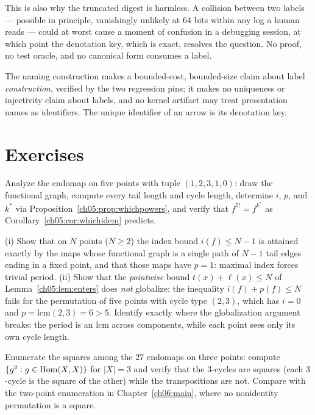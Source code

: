 This is also why the truncated digest is harmless. A collision between two
labels --- possible in principle, vanishingly unlikely at 64 bits within
any log a human reads --- could at worst cause a moment of confusion in a
debugging session, at which point the denotation key, which is exact,
resolves the question. No proof, no test oracle, and no canonical form
consumes a label.

\begin{boundary}
\label{ch05:bound:names}
The naming construction makes a bounded-cost, bounded-size claim about
label \emph{construction}, verified by the two regression pins; it makes no
uniqueness or injectivity claim about labels, and no kernel artifact may
treat presentation names as identifiers. The unique identifier of an arrow
is its denotation key.
\end{boundary}

\section{Exercises}
\label{ch05:sec:exercises}

\begin{exercise}
\label{ch05:ex:analyze}
Analyze the endomap on five points with tuple $(1, 2, 3, 1, 0)$: draw the
functional graph, compute every tail length and cycle length, determine
$i$, $p$, and $k^{*}$ via Proposition~\ref{ch05:prop:whichpowers}, and
verify that $f^{5!} = f^{k^{*}}$ as Corollary~\ref{ch05:cor:whichidem}
predicts.
\end{exercise}

\begin{exercise}
\label{ch05:ex:extremal}
(i) Show that on $N$ points ($N \ge 2$) the index bound $i(f) \le N - 1$
is attained exactly by the maps whose functional graph is a single path of
$N - 1$ tail edges ending in a fixed point, and that those maps have
$p = 1$: maximal index forces trivial period. (ii) Show that the
\emph{pointwise} bound $t(x) + \ell(x) \le N$ of
Lemma~\ref{ch05:lem:enters} does \emph{not} globalize: the inequality
$i(f) + p(f) \le N$ fails for the permutation of five points with cycle
type $(2, 3)$, which has $i = 0$ and $p = \mathrm{lcm}(2, 3) = 6 > 5$.
Identify exactly where the globalization argument breaks: the period is an
lcm across components, while each point sees only its own cycle length.
\end{exercise}

\begin{exercise}
\label{ch05:ex:squares}
Enumerate the squares among the $27$ endomaps on three points: compute
$\{ g^{2} : g \in \mathrm{Hom}(X, X) \}$ for $|X| = 3$ and verify that the
$3$-cycles are squares (each $3$-cycle is the square of the other) while
the transpositions are not. Compare with the two-point enumeration in
Chapter~\ref{ch06:main}, where no nonidentity permutation is a square.
\end{exercise}


